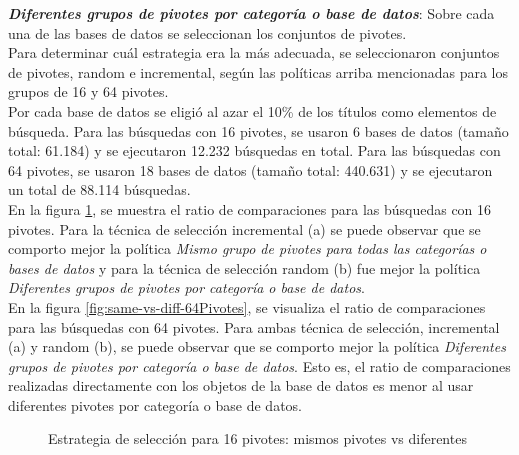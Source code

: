 \textit{\textbf{Diferentes grupos de pivotes por categor\'ia o base de datos}}: Sobre cada una de las bases de datos se seleccionan los conjuntos de pivotes.\\

Para determinar cu\'al estrategia era la m\'as adecuada, se seleccionaron conjuntos de pivotes, random e incremental, seg\'un las pol\'iticas arriba mencionadas para los grupos de 16 y 64 pivotes.\\

Por cada base de datos se eligi\'o al azar el 10\% de los t\'itulos como elementos de b\'usqueda. Para las b\'usquedas con 16 pivotes, se usaron 6 bases de datos (tamaño total: 61.184) y se ejecutaron 12.232  b\'usquedas en total. Para las b\'usquedas con 64 pivotes, se usaron 18 bases de datos (tamaño total: 440.631) y se ejecutaron un total de 88.114 b\'usquedas.\\

En la figura \ref{fig:same-vs-diff-16Pivotes}, se muestra el ratio de comparaciones para las b\'usquedas con 16 pivotes. Para la t\'ecnica de selecci\'on incremental (a) se puede observar que se comporto mejor la pol\'itica \textit{Mismo grupo de pivotes para todas las categor\'ias o bases de datos} y para la t\'ecnica de selecci\'on random (b) fue mejor la pol\'itica \textit{Diferentes grupos de pivotes por categor\'ia o base de datos}.\\

En la figura \ref{fig:same-vs-diff-64Pivotes}, se visualiza el ratio de comparaciones para las b\'usquedas con 64 pivotes. Para ambas t\'ecnica de selecci\'on, incremental (a) y random (b), se puede observar que se comporto mejor la pol\'itica \textit{Diferentes grupos de pivotes por categor\'ia o base de datos}. Esto es, el ratio de comparaciones realizadas directamente con los objetos de la base de datos es menor al usar diferentes pivotes por categor\'ia o base de datos.\\

\begin{figure}[tb]
\centering
{}
		\caption{\small Estrategia de selecci\'on para 16 pivotes: mismos pivotes vs diferentes}
		\label{fig:same-vs-diff-16Pivotes}
\end{figure}

